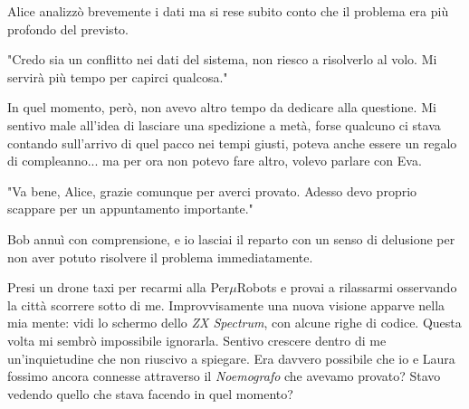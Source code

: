Alice analizzò brevemente i dati ma si rese subito conto che il problema era più profondo del previsto.

\begin{dialogue}
 "Credo sia un conflitto nei dati del sistema, non riesco a risolverlo al volo. Mi servirà più tempo per capirci qualcosa."
\end{dialogue}

In quel momento, però, non avevo altro tempo da dedicare alla questione. Mi sentivo male all'idea di lasciare una spedizione a metà, forse qualcuno ci stava contando sull'arrivo di quel pacco nei tempi giusti, poteva anche essere un regalo di compleanno... ma per ora non potevo fare altro, volevo parlare con Eva. 

\begin{dialogue}
 "Va bene, Alice, grazie comunque per averci provato. Adesso devo proprio scappare per un appuntamento importante."
\end{dialogue}

Bob annuì con comprensione, e io lasciai il reparto con un senso di delusione per non aver potuto risolvere il problema immediatamente.


\vspace{1em}
 Presi un drone taxi per recarmi alla Per$\mu$Robots e provai a rilassarmi osservando la città scorrere sotto di me. Improvvisamente una nuova visione apparve nella mia mente: vidi lo schermo dello \emph{ZX Spectrum}, con alcune righe di codice. Questa volta mi sembrò impossibile ignorarla. Sentivo crescere dentro di me un'inquietudine che non riuscivo a spiegare. Era davvero possibile che io e Laura fossimo ancora connesse attraverso il \emph{Noemografo} che avevamo provato? Stavo vedendo quello che stava facendo in quel momento?


